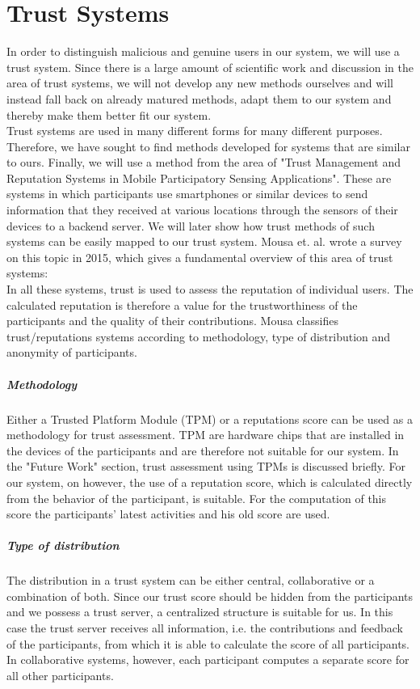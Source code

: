 \section{Trust Systems}\label{sec:Trust Systems}
In order to distinguish malicious and genuine users in our system, we will use a trust system. Since there is a large amount of scientific work and discussion in the area of trust systems, we will not develop any new methods ourselves and will instead fall back on already matured methods, adapt them to our system and thereby make them better fit our system.\\

Trust systems are used in many different forms for many different purposes. Therefore, we have sought to find methods developed for systems that are similar to ours. Finally, we will use a method from the area of "Trust Management and Reputation Systems in Mobile Participatory Sensing Applications". These are systems in which participants use smartphones or similar devices to send information that they received at various locations through the sensors of their devices to a backend server. We will later show how trust methods of such systems can be easily mapped to our trust system. Mousa et. al. wrote a survey on this topic in 2015, which gives a fundamental overview of this area of trust systems\cite{mousa2015trust}:\\

In all these systems, trust is used to assess the reputation of individual users. The calculated reputation is therefore a value for the trustworthiness of the participants and the quality of their contributions. Mousa classifies trust/reputations systems according to methodology, type of distribution and anonymity of participants. 

\subparagraph{Methodology} Either a Trusted Platform Module (TPM) or a reputations score can be used as a methodology for trust assessment. TPM are hardware chips that are installed in the devices of the participants and are therefore not suitable for our system. In the "Future Work" section, trust assessment using TPMs is discussed briefly. For our system, on however, the use of a reputation score, which is calculated directly from the behavior of the participant, is suitable. For the computation of this score the participants' latest activities and his old score are used.

\subparagraph{Type of distribution} The distribution in a trust system can be either central, collaborative or a combination of both. Since our trust score should be hidden from the participants and we possess a trust server, a centralized structure is suitable for us. In this case the trust server receives all information, i.e. the contributions and feedback of the participants, from which it is able to calculate the score of all participants. In collaborative systems, however, each participant computes a separate score for all other participants.

